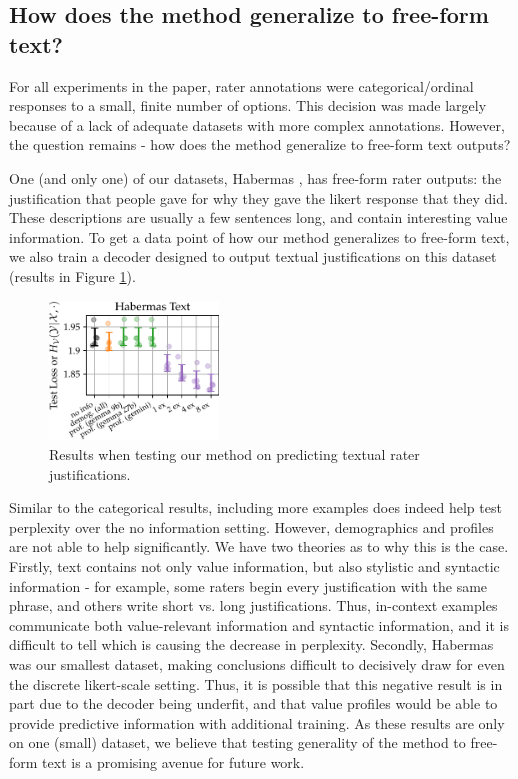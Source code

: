 \documentclass[11pt]{article}
\begin{document}

\subsection{How does the method generalize to free-form text?}

For all experiments in the paper, rater annotations were categorical/ordinal responses to a small, finite number of options. This decision was made largely because of a lack of adequate datasets with more complex annotations. However, the question remains - how does the method generalize to free-form text outputs?

One (and only one) of our datasets, Habermas \citep{habermas}, has free-form rater outputs: the justification that people gave for why they gave the likert response that they did. These descriptions are usually a few sentences long, and contain interesting value information. To get a data point of how our method generalizes to free-form text, we also train a decoder designed to output textual justifications on this dataset (results in Figure \ref{fig:habtext}).

\begin{figure}[h]
\centering
\includegraphics[width=0.4\textwidth]{files/habermas_text.pdf}
\caption{Results when testing our method on predicting textual rater justifications.}
\label{fig:habtext}
\end{figure}

Similar to the categorical results, including more examples does indeed help test perplexity over the no information setting. However, demographics and profiles are not able to help significantly. We have two theories as to why this is the case. Firstly, text contains not only value information, but also stylistic and syntactic information - for example, some raters begin every justification with the same phrase, and others write short vs. long justifications. Thus, in-context examples communicate both value-relevant information and syntactic information, and it is difficult to tell which is causing the decrease in perplexity. Secondly, Habermas was our smallest dataset, making conclusions difficult to decisively draw for even the discrete likert-scale setting. Thus, it is possible that this negative result is in part due to the decoder being underfit, and that value profiles would be able to provide predictive information with additional training.
As these results are only on one (small) dataset, we believe that testing generality of the method to free-form text is a promising avenue for future work.
\end{document}
